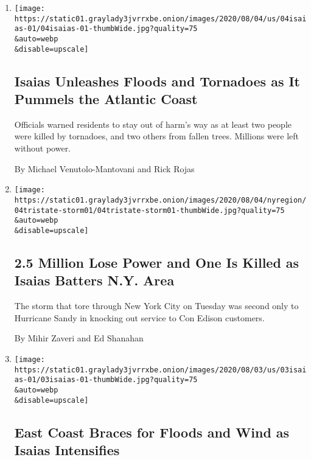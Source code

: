 \begin{enumerate}
\def\labelenumi{\arabic{enumi}.}
\item
  \href{/2020/08/04/us/hurricane-isaias-updates.html}{}

  \texttt{[image: https://static01.graylady3jvrrxbe.onion/images/2020/08/04/us/04isaias-01/04isaias-01-thumbWide.jpg?quality=75\\\&auto=webp\\\&disable=upscale]}

  \hypertarget{isaias-unleashes-floods-and-tornadoes-as-it-pummels-the-atlantic-coast}{%
  \subsection{Isaias Unleashes Floods and Tornadoes as It Pummels the
  Atlantic
  Coast}\label{isaias-unleashes-floods-and-tornadoes-as-it-pummels-the-atlantic-coast}}

  Officials warned residents to stay out of harm's way as at least two
  people were killed by tornadoes, and two others from fallen trees.
  Millions were left without power.

  By Michael Venutolo-Mantovani and Rick Rojas
\item
  \href{/2020/08/04/nyregion/isaias-ny.html}{}

  \texttt{[image: https://static01.graylady3jvrrxbe.onion/images/2020/08/04/nyregion/04tristate-storm01/04tristate-storm01-thumbWide.jpg?quality=75\\\&auto=webp\\\&disable=upscale]}

  \hypertarget{25-million-lose-power-and-one-is-killed-as-isaias-batters-ny-area}{%
  \subsection{2.5 Million Lose Power and One Is Killed as Isaias Batters
  N.Y.
  Area}\label{25-million-lose-power-and-one-is-killed-as-isaias-batters-ny-area}}

  The storm that tore through New York City on Tuesday was second only
  to Hurricane Sandy in knocking out service to Con Edison customers.

  By Mihir Zaveri and Ed Shanahan
\item
  \href{/2020/08/03/us/isaias-east-coast-landfall.html}{}

  \texttt{[image: https://static01.graylady3jvrrxbe.onion/images/2020/08/03/us/03isaias-01/03isaias-01-thumbWide.jpg?quality=75\\\&auto=webp\\\&disable=upscale]}

  \hypertarget{east-coast-braces-for-floods-and-wind-as-isaias-intensifies}{%
  \subsection{East Coast Braces for Floods and Wind as Isaias
  Intensifies}\label{east-coast-braces-for-floods-and-wind-as-isaias-intensifies}}


\end{enumerate}
